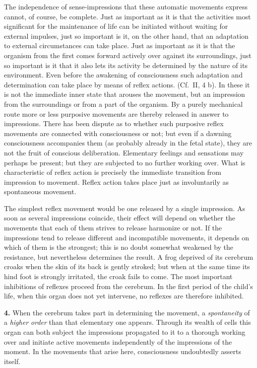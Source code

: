 \documentclass[12pt,a4paper]{book}
\newcommand{\opage}[1]{\marginnote{\footnotesize\textit{[#1]}}}
\begin{document}
The independence of sense-impressions that these automatic movements
express cannot, of course, be complete. Just as important as it is that
the activities most significant for the maintenance of life can be
initiated without waiting for external impulses, just so important is it,
on the other hand, that an adaptation to external circumstances can take
place. Just as important as it is that the organism from the first comes
forward actively over against its surroundings, just so important is it
that it also lets its activity be determined by
\opage{369}the nature of its environment. Even before the awakening of
consciousness such adaptation and determination can take place by means
of reflex actions. (Cf.\ II, 4 b). In these it is not the immediate inner
state that arouses the movement, but an impression from the surroundings
or from a part of the organism. By a purely mechanical route more or
less purposive movements are thereby released in answer to impressions.
There has been dispute as to whether such purposive reflex movements are
connected with consciousness or not; but even if a dawning consciousness
accompanies them (as probably already in the fetal state), they are not
the fruit of conscious deliberation. Elementary feelings and sensations
may perhaps be present; but they are subjected to no further working
over. What is characteristic of reflex action is precisely the immediate
transition from impression to movement. Reflex action takes place just
as involuntarily as spontaneous movement.

The simplest reflex movement would be one released by a single
impression. As soon as several impressions coincide, their effect will
depend on whether the movements that each of them strives to release
harmonize or not. If the impressions tend to release different and
incompatible movements, it depends on which of them is the strongest;
this is no doubt somewhat weakened by the resistance, but nevertheless
determines the result. A frog deprived of its cerebrum croaks when the
skin of its back is gently stroked; but when at the same time its hind
foot is strongly irritated, the croak fails to come. The most important
inhibitions of reflexes proceed from the cerebrum. In the first period of
the child's life, when this organ does not yet intervene, no reflexes are
therefore inhibited.

\textbf{4.} When the cerebrum takes part in determining the movement, a
\emph{spontaneity} of a \emph{higher order} than that elementary one
appears. Through its wealth of cells this organ can both subject the
impressions propagated to it to a thorough working over and initiate
active movements independently of the impressions of the moment. In the
movements that arise here, consciousness undoubtedly asserts itself.
\end{document}
